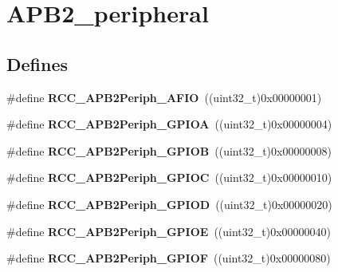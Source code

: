 \hypertarget{group__APB2__peripheral}{
\section{APB2\_\-peripheral}
\label{group__APB2__peripheral}
}
\subsection*{Defines}
\begin{DoxyCompactItemize}
\item 
\hypertarget{group__APB2__peripheral_ga5aa9469879ffa019d4836b0d297104c5}{
\#define {\bfseries RCC\_\-APB2Periph\_\-AFIO}~((uint32\_\-t)0x00000001)}
\label{group__APB2__peripheral_ga5aa9469879ffa019d4836b0d297104c5}

\item 
\hypertarget{group__APB2__peripheral_ga44b92fbf2e288796b1acbce2708f3636}{
\#define {\bfseries RCC\_\-APB2Periph\_\-GPIOA}~((uint32\_\-t)0x00000004)}
\label{group__APB2__peripheral_ga44b92fbf2e288796b1acbce2708f3636}

\item 
\hypertarget{group__APB2__peripheral_ga8c8909c3640508e9ce31dff80010a6dd}{
\#define {\bfseries RCC\_\-APB2Periph\_\-GPIOB}~((uint32\_\-t)0x00000008)}
\label{group__APB2__peripheral_ga8c8909c3640508e9ce31dff80010a6dd}

\item 
\hypertarget{group__APB2__peripheral_gaf1f4b467becee1ff31ba2c54328a0115}{
\#define {\bfseries RCC\_\-APB2Periph\_\-GPIOC}~((uint32\_\-t)0x00000010)}
\label{group__APB2__peripheral_gaf1f4b467becee1ff31ba2c54328a0115}

\item 
\hypertarget{group__APB2__peripheral_ga177200a365084af306e98389edeba42b}{
\#define {\bfseries RCC\_\-APB2Periph\_\-GPIOD}~((uint32\_\-t)0x00000020)}
\label{group__APB2__peripheral_ga177200a365084af306e98389edeba42b}

\item 
\hypertarget{group__APB2__peripheral_gabc736c9892278ccd15848c6137d991fc}{
\#define {\bfseries RCC\_\-APB2Periph\_\-GPIOE}~((uint32\_\-t)0x00000040)}
\label{group__APB2__peripheral_gabc736c9892278ccd15848c6137d991fc}

\item 
\hypertarget{group__APB2__peripheral_ga2dbb1e1116b57621c585e1b52c894bda}{
\#define {\bfseries RCC\_\-APB2Periph\_\-GPIOF}~((uint32\_\-t)0x00000080)}
\label{group__APB2__peripheral_ga2dbb1e1116b57621c585e1b52c894bda}


\end{DoxyCompactItemize}
